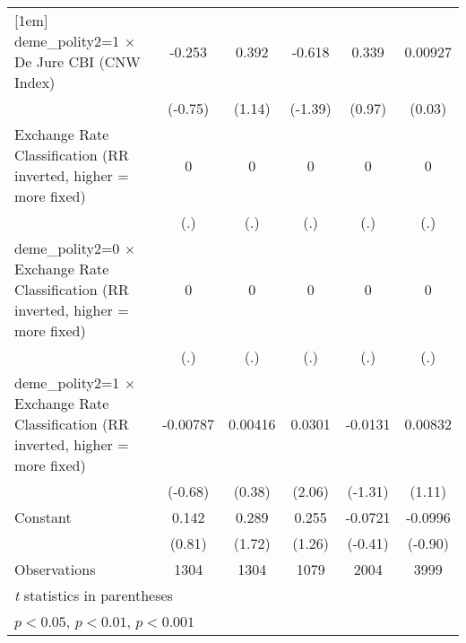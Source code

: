 {\begin{tabular*}{\linewidth}{@{\hskip\tabcolsep\extracolsep\fill}l*{5}{c}}
[1em]
deme\_polity2=1 $\times$ De Jure CBI (CNW Index)&   -0.253         &    0.392         &   -0.618         &    0.339         &  0.00927         \\
                &  (-0.75)         &   (1.14)         &  (-1.39)         &   (0.97)         &   (0.03)         \\
[1em]
Exchange Rate Classification (RR inverted, higher = more fixed)&        0         &        0         &        0         &        0         &        0         \\
                &      (.)         &      (.)         &      (.)         &      (.)         &      (.)         \\
[1em]
deme\_polity2=0 $\times$ Exchange Rate Classification (RR inverted, higher = more fixed)&        0         &        0         &        0         &        0         &        0         \\
                &      (.)         &      (.)         &      (.)         &      (.)         &      (.)         \\
[1em]
deme\_polity2=1 $\times$ Exchange Rate Classification (RR inverted, higher = more fixed)& -0.00787         &  0.00416         &   0.0301\sym{*}  &  -0.0131         &  0.00832         \\
                &  (-0.68)         &   (0.38)         &   (2.06)         &  (-1.31)         &   (1.11)         \\
[1em]
Constant        &    0.142         &    0.289         &    0.255         &  -0.0721         &  -0.0996         \\
                &   (0.81)         &   (1.72)         &   (1.26)         &  (-0.41)         &  (-0.90)         \\
\hline
Observations    &     1304         &     1304         &     1079         &     2004         &     3999         \\
\hline\hline
\multicolumn{6}{l}{\footnotesize \textit{t} statistics in parentheses}\\
\multicolumn{6}{l}{\footnotesize \sym{*} \(p<0.05\), \sym{**} \(p<0.01\), \sym{***} \(p<0.001\)}\\
\end{tabular*}
}
